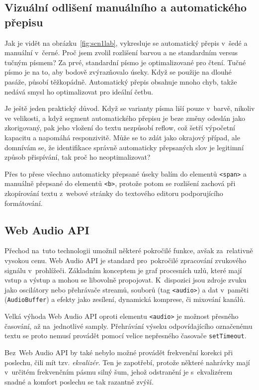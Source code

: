\subsection{Vizuální odlišení manuálního a automatického přepisu}

Jak je vidět na obrázku~\ref{fig:scn1lab}, vykresluje se automatický přepis
v~šedé a manuální v~černé. Proč jsem zvolil rozlišení barvou a ne standardním
versus tučným písmem? Za prvé, standardní písmo je optimalizované pro čtení.
Tučné písmo je na to, aby bodově zvýrazňovalo úseky. Když se použije na dlouhé
pasáže, působí těžkopádně. Automatický přepis obsahuje mnoho chyb, takže nedává
smysl ho optimalizovat pro ideální četbu.

Je ještě jeden praktický důvod. Když se varianty písma liší pouze v~barvě,
nikoliv ve velikosti, a když segment automatického přepisu je beze změny odeslán
jako zkorigovaný, pak jeho vložení do textu nezpůsobí reflow, což šetří
výpočetní kapacitu a napomáhá responzivitě. Může se to zdát jako okrajový
případ, ale domnívám se, že identifikace správně automaticky přepsaných slov je
legitimní způsob přispívání, tak proč ho neoptimalizovat?

Přes to přese všechno automaticky přepsané úseky balím do elementů
\texttt{<span>} a manuálně přepsané do elementů \texttt{<b>}, protože potom se
rozlišení zachová při zkopírování textu z~webové stránky do textového editoru
podporujícího formátování.

\subsection{Web Audio API}

Přechod na~tuto technologii umožnil některé pokročilé funkce, avšak za~relativně
vysokou cenu. Web Audio API je standard pro~pokročilé zpracování zvukového
signálu v~prohlížeči. Základním konceptem je graf procesních uzlů, které mají
vstup a výstup a mohou se libovolně propojovat. K~dispozici jsou zdroje zvuku
jako oscilátory nebo přehrávače streamů, souborů (tag \texttt{<audio>}) a dat
v~paměti (\texttt{AudioBuffer}) a efekty jako zesílení, dynamická komprese, či
mixování kanálů.

Velká výhoda Web Audio API oproti elementu \texttt{<audio>} je možnost přesného
časování, až na~jednotlivé samply. Přehrávání výseku odpovídajícího označenému
textu se proto nemusí provádět pomocí velice nepřesného časovače
\texttt{setTimeout}.

Bez~Web Audio API by také nebylo možné provádět frekvenční korekci při poslechu,
čili mít tzv. \textit{ekvalizér}. Ten je zapotřebí, protože některé nahrávky
mají v~určitém frekvenčním pásmu silný šum, jehož odstranění je s~ekvalizérem
snadné a komfort poslechu se tak razantně zvýší.

